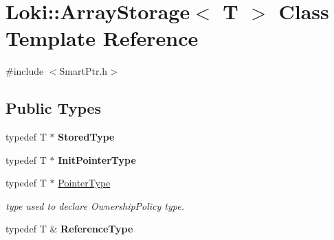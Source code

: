 \hypertarget{classLoki_1_1ArrayStorage}{}\section{Loki\+:\+:Array\+Storage$<$ T $>$ Class Template Reference}
\label{classLoki_1_1ArrayStorage}


{\ttfamily \#include $<$Smart\+Ptr.\+h$>$}

\subsection*{Public Types}
\begin{DoxyCompactItemize}
\item 
\hypertarget{classLoki_1_1ArrayStorage_a50113d204fa951d98c02e6456fde42bc}{}typedef T $\ast$ {\bfseries Stored\+Type}\label{classLoki_1_1ArrayStorage_a50113d204fa951d98c02e6456fde42bc}

\item 
\hypertarget{classLoki_1_1ArrayStorage_a314a0fce4f6295567841541ccb4626dd}{}typedef T $\ast$ {\bfseries Init\+Pointer\+Type}\label{classLoki_1_1ArrayStorage_a314a0fce4f6295567841541ccb4626dd}

\item 
\hypertarget{classLoki_1_1ArrayStorage_ac1c79b615bc1bfffe6b8b8a4c17ff71a}{}typedef T $\ast$ \hyperlink{classLoki_1_1ArrayStorage_ac1c79b615bc1bfffe6b8b8a4c17ff71a}{Pointer\+Type}\label{classLoki_1_1ArrayStorage_ac1c79b615bc1bfffe6b8b8a4c17ff71a}

\begin{DoxyCompactList}\small\item\em type used to declare Ownership\+Policy type. \end{DoxyCompactList}\item 
\hypertarget{classLoki_1_1ArrayStorage_ad2c3e055027e52820f74835ae14e0bde}{}typedef T \& {\bfseries Reference\+Type}\label{classLoki_1_1ArrayStorage_ad2c3e055027e52820f74835ae14e0bde}

\end{DoxyCompactItemize}
